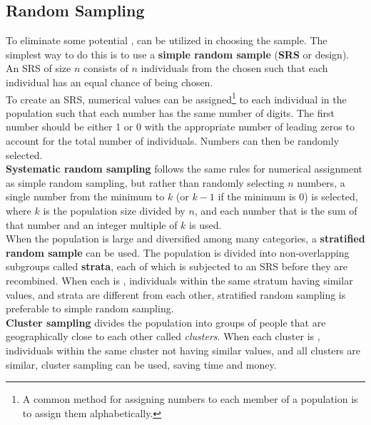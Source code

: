 \documentclass[../AP_Statistics.tex]{subfiles}
\begin{document}
		\subsection*{Random Sampling}
			To eliminate some potential ,  can be utilized in choosing the sample. The simplest way to do this is to use a \textbf{simple random sample} (\textbf{SRS} or  design). An SRS of size $n$ consists of $n$ individuals from the  chosen such that each individual has an equal chance of being chosen. \\
			To create an SRS, numerical values can be assigned\footnote{A common method for assigning numbers to each member of a population is to assign them alphabetically.} to each individual in the population such that each number has the same number of digits. The first number should be either 1 or 0 with the appropriate number of leading zeros to account for the total number of individuals. Numbers can then be randomly selected. \\
			\textbf{Systematic random sampling} follows the same rules for numerical assignment as simple random sampling, but rather than randomly selecting $n$ numbers, a single number from the minimum to $k$ (or $k - 1$ if the minimum is 0) is selected, where $k$ is the population size divided by $n$, and each number that is the sum of that number and an integer multiple of $k$ is used. \\
			When the population is large and diversified among many categories, a \textbf{stratified random sample} can be used. The population is divided into non-overlapping subgroups called \textbf{strata}, each of which is subjected to an SRS before they are recombined. When each  is , individuals within the same stratum having similar values, and strata are different from each other, stratified random sampling is preferable to simple random sampling. \\
			\textbf{Cluster sampling} divides the population into groups of people that are geographically close to each other called \emph{clusters}. When each cluster is , individuals within the same cluster not having similar values, and all clusters are similar, cluster sampling can be used, saving time and money. \\
\end{document}
